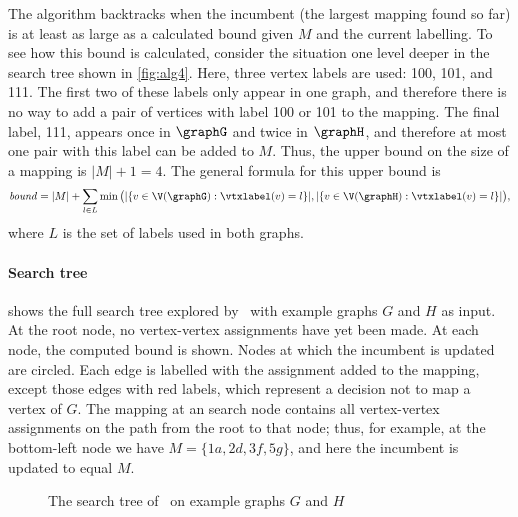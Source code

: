 The algorithm backtracks when the incumbent (the largest mapping found so far) is at least as large
as a calculated bound given $M$ and the current labelling. To see how
this bound is calculated, consider the situation one level deeper in the
search tree shown in \cref{fig:alg4}.  
Here, three vertex labels are used: 100,
101, and 111.  The first two of these labels only appear in one graph, and therefore
there is no way to add a pair of vertices with label 100 or 101 to the mapping.
The final label, 111, appears once in $\graphG$ and twice in $\graphH$, and therefore at
most one pair with this label can be added to $M$.  Thus, the upper bound on
the size of a mapping is $|M| + 1 = 4$. The general formula for this upper bound is
\begin{multline*}
    \mathit{bound} = |M| + \sum_{l \in L} \min\big(|\{ v \in \V(\graphG) : \vtxlabel(v)=l\}|,
        |\{ v \in \V(\graphH) : \vtxlabel(v)=l \}|\big) \text{,}
\end{multline*} where $L$ is the set of labels used in both graphs.


\paragraph{Search tree}  shows the full search
tree explored by \McSplit\ with example graphs $G$ and $H$ as input.
At the root node, no vertex-vertex assignments have yet been made.  At each node,
the computed bound is shown.  Nodes at which the incumbent is updated are circled.
Each edge is labelled with the assignment added to the mapping, except those edges
with red labels, which represent a decision not to map a vertex of $G$.
The mapping at an search node contains all vertex-vertex assignments on the path
from the root to that node; thus, for example, at the bottom-left node
we have $M=\{1a,2d,3f,5g\}$, and here the incumbent is updated to equal $M$.

\begin{figure}[htb]
    \centering
    
    \caption{The search tree of \McSplit\ on example graphs $G$ and $H$}
    \label{figure:mcsplit-search-tree}
\end{figure}


